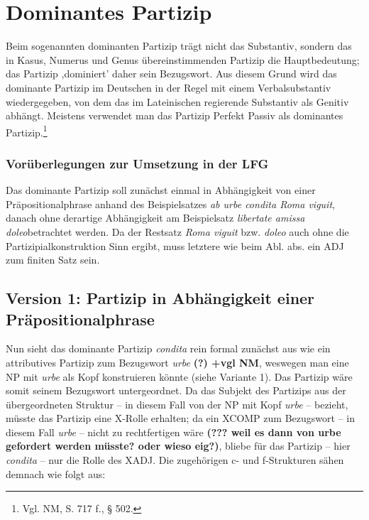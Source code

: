 \documentclass[12pt,a4paper]{article}
\begin{document}
\section{Dominantes Partizip}
Beim sogenannten dominanten Partizip trägt nicht das Substantiv, sondern das in Kasus, Numerus und Genus übereinstimmenden Partizip die Hauptbedeutung; das Partizip ,dominiert' daher sein Bezugswort.
Aus diesem Grund wird das dominante Partizip im Deutschen in der Regel mit einem Verbalsubstantiv wiedergegeben, von dem das im Lateinischen regierende Substantiv als Genitiv abhängt. Meistens verwendet man das Partizip Perfekt Passiv als dominantes Partizip.\footnote{Vgl. NM, S. 717 f., § 502.}\\

\subsubsection{Vorüberlegungen zur Umsetzung in der LFG}
Das dominante Partizip soll zunächst einmal in Abhängigkeit von einer Präpositionalphrase anhand des Beispielsatzes \textit{ab urbe condita Roma viguit}, danach ohne derartige Abhängigkeit am Beispielsatz \textit{libertate amissa doleo}betrachtet werden. Da der Restsatz \textit{Roma viguit} bzw. \textit{doleo} auch ohne die Partizipialkonstruktion Sinn ergibt, muss letztere wie beim Abl. abs. ein ADJ zum finiten Satz sein.

\subsection{Version 1: Partizip in Abhängigkeit einer Präpositionalphrase}
Nun sieht das dominante Partizip \textit{condita} rein formal zunächst aus wie ein attributives Partizip zum Bezugswort \textit{urbe} \textbf{(?) +vgl NM}, weswegen man eine NP mit \textit{urbe} als Kopf konstruieren könnte (siehe Variante 1). Das Partizip wäre somit seinem Bezugswort untergeordnet. Da das Subjekt des Partizips aus der übergeordneten Struktur -- in diesem Fall von der NP mit Kopf \textit{urbe} -- bezieht, müsste das Partizip eine X-Rolle erhalten; da ein XCOMP zum Bezugswort -- in diesem Fall \textit{urbe} -- nicht zu rechtfertigen wäre \textbf{(??? weil es dann von urbe gefordert werden müsste? oder wieso eig?)}, bliebe für das Partizip -- hier \textit{condita} -- nur die Rolle des XADJ. Die zugehörigen c- und f-Strukturen sähen demnach wie folgt aus:
\end{document}
